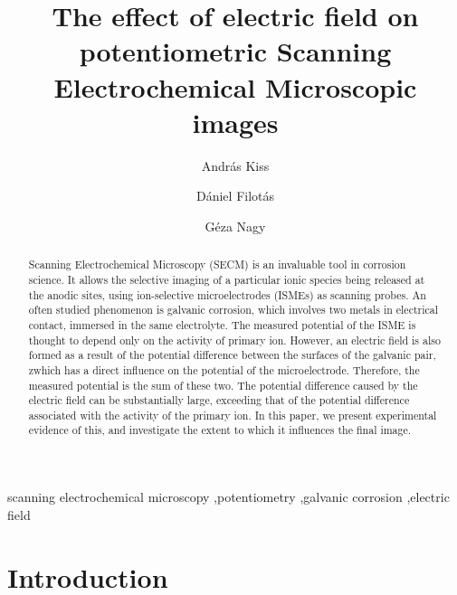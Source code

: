 \documentclass[3p]{elsarticle}
\begin{document}
\begin{frontmatter}

\title{The effect of electric field on potentiometric Scanning Electrochemical Microscopic images}
\author[akiss]{András Kiss}
\address[akiss, gnagy]{Department of General and Physical Chemistry, Faculty of Sciences, University of Pécs, 7624 Pécs, Ifjúság útja 6, Hungary}
\author[dfilotas]{Dániel Filotás}
\author[gnagy]{Géza Nagy}


\begin{abstract}

Scanning Electrochemical Microscopy (SECM) is an invaluable tool in corrosion science.
It allows the selective imaging of a particular ionic species being released at the anodic sites, using ion-selective microelectrodes (ISMEs) as scanning probes.
An often studied phenomenon is galvanic corrosion, which involves two metals in electrical contact, immersed in the same electrolyte.
The measured potential of the ISME is thought to depend only on the activity of primary ion.
However, an electric field is also formed as a result of the potential difference between the surfaces of the galvanic pair, 
zwhich has a direct influence on the potential of the microelectrode.
Therefore, the measured potential is the sum of these two.
The potential difference caused by the electric field can be substantially large, exceeding that of the potential difference associated with the activity of the primary ion.
In this paper, we present experimental evidence of this, and investigate the extent to which it influences the final image. 
\end{abstract}
\begin{keyword}
	scanning electrochemical microscopy \sep potentiometry \sep galvanic corrosion \sep electric field
\end{keyword}
\end{frontmatter}

\section{Introduction}
\end{document}
